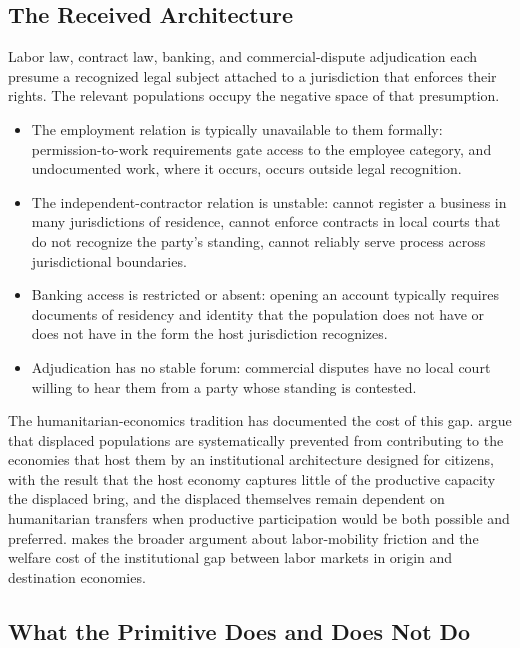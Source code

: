 \documentclass[11pt,a4paper]{article}
\theoremstyle{remark}
\begin{document}
\subsection{The Received Architecture}

Labor law, contract law, banking, and commercial-dispute
adjudication each presume a recognized legal subject attached to
a jurisdiction that enforces their rights. The relevant
populations occupy the negative space of that presumption.

\begin{itemize}
  \item The employment relation is typically unavailable to them
    formally: permission-to-work requirements gate access to the
    employee category, and undocumented work, where it occurs,
    occurs outside legal recognition.
  \item The independent-contractor relation is unstable: cannot
    register a business in many jurisdictions of residence, cannot
    enforce contracts in local courts that do not recognize the
    party's standing, cannot reliably serve process across
    jurisdictional boundaries.
  \item Banking access is restricted or absent: opening an account
    typically requires documents of residency and identity that
    the population does not have or does not have in the form the
    host jurisdiction recognizes.
  \item Adjudication has no stable forum: commercial disputes have
    no local court willing to hear them from a party whose
    standing is contested.
\end{itemize}

The humanitarian-economics tradition has documented the cost of
this gap. \citet{betts_collier_2017} argue that displaced
populations are systematically prevented from contributing to the
economies that host them by an institutional architecture
designed for citizens, with the result that the host economy
captures little of the productive capacity the displaced bring,
and the displaced themselves remain dependent on humanitarian
transfers when productive participation would be both possible
and preferred. \citet{pritchett2006people} makes the broader
argument about labor-mobility friction and the welfare cost of
the institutional gap between labor markets in origin and
destination economies.

\subsection{What the Primitive Does and Does Not Do}
\end{document}
